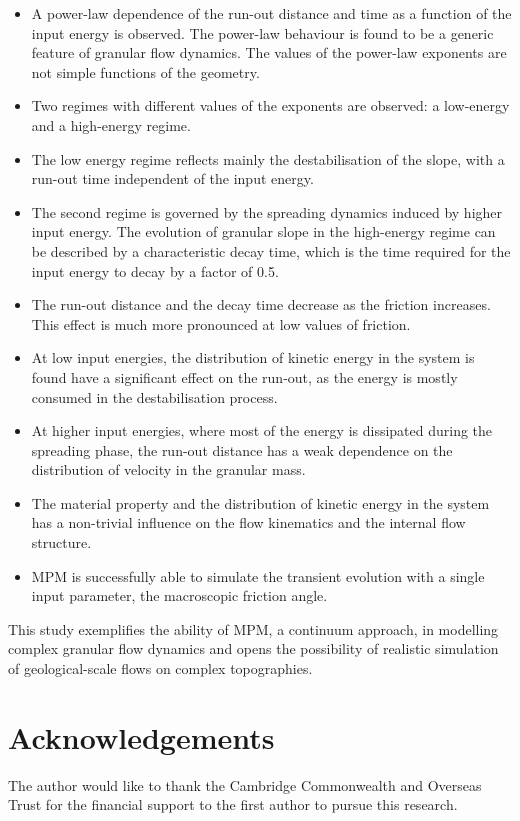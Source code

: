 \documentclass[3p,times,procedia,number]{elsarticle}
\begin{document}
\begin{itemize}

  \item A power-law dependence of the run-out distance and time as a 
    function of the input energy is observed. The power-law behaviour is found to 
    be a generic feature of granular flow dynamics. The values of the power-law
    exponents are not simple functions of the geometry. 

  \item Two regimes with different values of the exponents are observed: 
    a low-energy and a high-energy regime. 

  \item The low energy regime reflects mainly the destabilisation of the slope, 
    with a run-out time independent of the input energy.

  \item The second regime is governed by the spreading dynamics 
    induced by higher input energy. The evolution of granular slope in the 
    high-energy regime can be described by a characteristic decay time, which is 
    the time required for the input energy to decay by a factor of 0.5.

  \item The run-out distance and the decay time decrease as the friction 
    increases. This effect is much more pronounced at low values of friction.

  \item  At low input energies, the distribution of kinetic energy in the system is 
    found have a significant effect on the run-out, as the energy is mostly 
    consumed in the destabilisation process. 
     
  \item At higher input energies, where most of the energy is dissipated during 
    the spreading phase, the run-out distance has a weak dependence on the 
    distribution of velocity in the granular mass. 

  \item The material property and the distribution of kinetic energy in the 
    system has a non-trivial influence on the flow kinematics and the internal flow 
    structure.

  \item MPM is successfully able to simulate the transient evolution with a 
    single input parameter, the macroscopic friction angle.

\end{itemize}

This study exemplifies the ability of MPM, a continuum approach,  in modelling 
complex granular flow dynamics and opens the possibility of realistic 
simulation of geological-scale flows on complex topographies.

\section*{Acknowledgements}
The author would like to thank the Cambridge Commonwealth and Overseas Trust for the financial support to the first author to pursue this research. 


 
\end{document}
